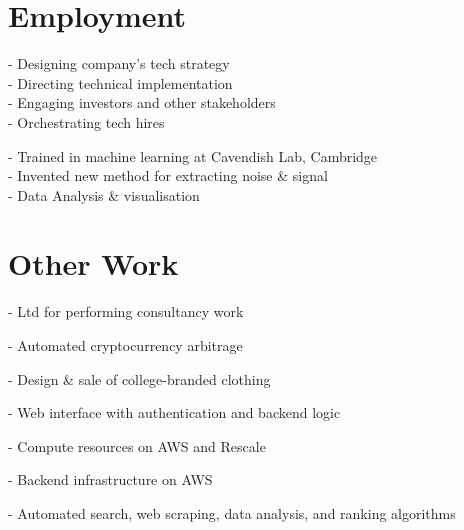 \documentclass[a4paper]{custom-resume}
\begin{document}
\begin{minipage}[t][0.82\textheight]{0.66\textwidth}


\section{Employment}

- Designing company's tech strategy \\
- Directing technical implementation \\
- Engaging investors and other stakeholders \\
- Orchestrating tech hires

- Trained in machine learning at Cavendish Lab, Cambridge \\
- Invented new method for extracting noise \& signal \\
- Data Analysis \& visualisation

\vfill


\section{Other Work}


- Ltd for performing consultancy work

- Automated cryptocurrency arbitrage

- Design \& sale of college-branded clothing



- Web interface with authentication and backend logic

- Compute resources on AWS and Rescale

- Backend infrastructure on AWS

- Automated search, web scraping, data analysis, and ranking algorithms


\end{minipage}
\end{document}
